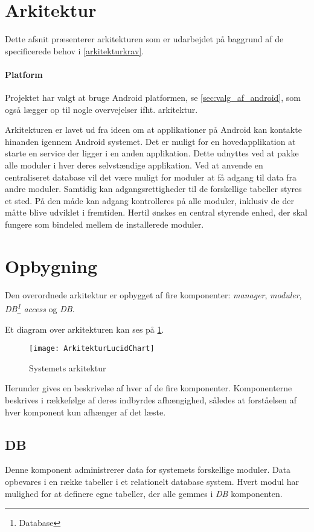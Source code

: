\section{Arkitektur}\label{sec:arkitektur}
Dette afsnit præsenterer arkitekturen som er udarbejdet på baggrund af de specificerede behov i \cref{arkitekturkrav}.

\paragraph{Platform}
Projektet har valgt at bruge Android platformen, se \cref{sec:valg_af_android}, som også lægger op til nogle overvejelser ifht. arkitektur.

Arkitekturen er lavet ud fra ideen om at applikationer på Android kan kontakte hinanden igennem Android systemet.
Det er muligt for en hovedapplikation at starte en service der ligger i en anden applikation.\cite{android_service}
Dette udnyttes ved at pakke alle moduler i hver deres selvstændige applikation.
Ved at anvende en centraliseret database vil det være muligt for moduler at få adgang til data fra andre moduler.
Samtidig kan adgangsrettigheder til de forskellige tabeller styres et sted.
På den måde kan adgang kontrolleres på alle moduler, inklusiv de der måtte blive udviklet i fremtiden.
Hertil ønskes en central styrende enhed, der skal fungere som bindeled mellem de installerede moduler.

\section{Opbygning}\label{arkitektur:opbygning}
Den overordnede arkitektur er opbygget af fire komponenter: \textit{manager}, \textit{moduler}, \textit{DB\footnote{Database} access} og \textit{DB}.

Et diagram over arkitekturen kan ses på \cref{arkitektur_udkast_1}.
\begin{figure}[h]
	\centering						%
	\texttt{[image: ArkitekturLucidChart]}
	\caption{Systemets arkitektur}
  \label{arkitektur_udkast_1}
\end{figure}

Herunder gives en beskrivelse af hver af de fire komponenter.
Komponenterne beskrives i rækkefølge af deres indbyrdes afhængighed, således at forståelsen af hver komponent kun afhænger af det læste.

\subsection{DB}
Denne komponent administrerer data for systemets forskellige moduler.
Data opbevares i en række tabeller i et relationelt database system.
Hvert modul har mulighed for at definere egne tabeller, der alle gemmes i \textit{DB} komponenten.

